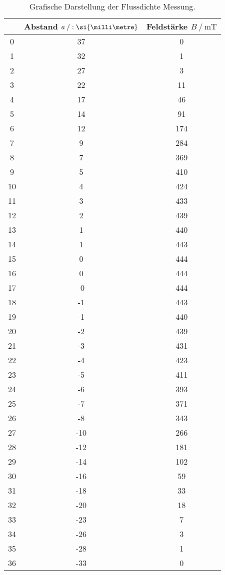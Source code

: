 \begin{table}
    \begin{tabular}{c|c c}
        \toprule
        {} &  Abstand $a \:/\/: \si{\milli\metre}$ &  Feldstärke $B \:/\: \si{\milli\tesla}$\\
        \midrule
        0  &     37 &           0 \\
        1  &     32 &           1 \\
        2  &     27 &           3 \\
        3  &     22 &          11 \\
        4  &     17 &          46 \\
        5  &     14 &          91 \\
        6  &     12 &         174 \\
        7  &      9 &         284 \\
        8  &      7 &         369 \\
        9  &      5 &         410 \\
        10 &      4 &         424 \\
        11 &      3 &         433 \\
        12 &      2 &         439 \\
        13 &      1 &         440 \\
        14 &      1 &         443 \\
        15 &      0 &         444 \\
        16 &      0 &         444 \\
        17 &     -0 &         444 \\
        18 &     -1 &         443 \\
        19 &     -1 &         440 \\
        20 &     -2 &         439 \\
        21 &     -3 &         431 \\
        22 &     -4 &         423 \\
        23 &     -5 &         411 \\
        24 &     -6 &         393 \\
        25 &     -7 &         371 \\
        26 &     -8 &         343 \\
        27 &    -10 &         266 \\
        28 &    -12 &         181 \\
        29 &    -14 &         102 \\
        30 &    -16 &          59 \\
        31 &    -18 &          33 \\
        32 &    -20 &          18 \\
        33 &    -23 &           7 \\
        34 &    -26 &           3 \\
        35 &    -28 &           1 \\
        36 &    -33 &           0 \\
        \bottomrule
    \end{tabular}
    \caption{Grafische Darstellung der Flussdichte Messung.}
    \label{tab:magnetfeld}
\end{table}


